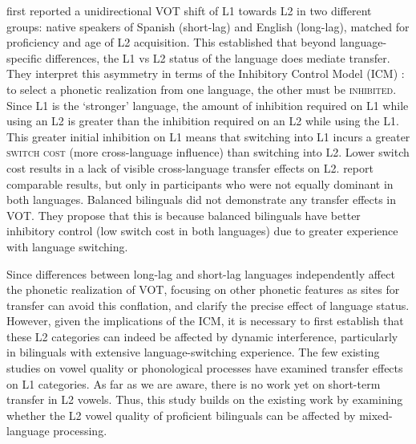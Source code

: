 \documentclass[12 pt]{article}
\begin{document}
\cite{olson2013bilingual} first reported a unidirectional VOT shift of L1 towards L2 in two different groups: native speakers of Spanish (short-lag) and English (long-lag), matched for proficiency and age of L2 acquisition. This established that beyond language-specific differences, the L1 vs L2 status of the language does mediate transfer. They interpret this asymmetry in terms of the Inhibitory Control Model (ICM) \citep{green1998mental}: to select a phonetic realization from one language, the other must be \textsc{inhibited}. Since L1 is the `stronger' language, the amount of inhibition required on L1 while using an L2 is greater than the inhibition required on an L2 while using the L1. This greater initial inhibition on L1 means that switching into L1 incurs a greater \textsc{switch cost} (more cross-language influence) than switching into L2. Lower switch cost results in a lack of visible cross-language transfer effects on L2. \cite{tsui2019impact} report comparable results, but only in participants who were not equally dominant in both languages. Balanced bilinguals did not demonstrate any transfer effects in VOT. They propose that this is because balanced bilinguals have better inhibitory control (low switch cost in both languages) due to greater experience with language switching.

Since differences between long-lag and short-lag languages independently affect the phonetic realization of VOT, focusing on other phonetic features as sites for transfer can avoid this conflation, and clarify the precise effect of language status. However, given the implications of the ICM, it is necessary to first establish that these L2 categories can indeed be affected by dynamic interference, particularly in bilinguals with extensive language-switching experience. The few existing studies on vowel quality \citep{simonet2014phonetic,muldner2019phonetics,elias2017effects} or phonological processes \citep{simonet2020increased,schwartz2015language} have examined transfer effects on L1 categories. As far as we are aware, there is no work yet on short-term transfer in L2 vowels. Thus, this study builds on the existing work by examining whether the L2 vowel quality of proficient bilinguals can be affected by mixed-language processing.
\end{document}
